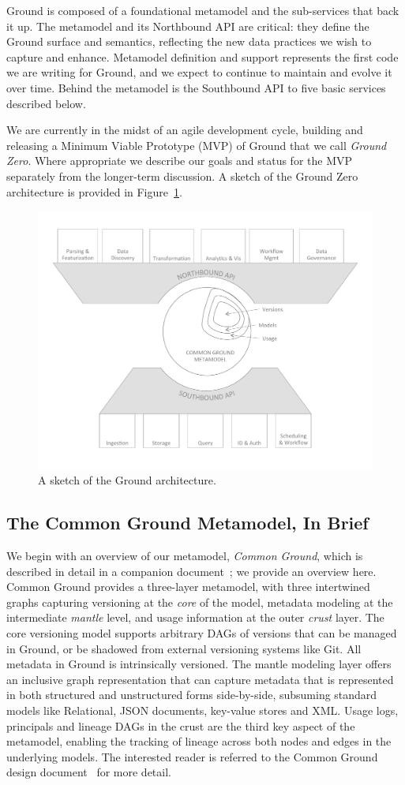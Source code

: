 Ground is composed of a foundational metamodel and the sub-services that back it up.  The metamodel and its Northbound API are critical: they define the Ground surface and semantics, reflecting the new data practices we wish to capture and enhance.  Metamodel definition and support represents the first code we are writing for Ground, and we expect to continue to maintain and evolve it over time.  Behind the metamodel is the Southbound API to five basic services described below.  

We are currently in the midst of an agile development cycle, building and releasing a Minimum Viable Prototype (MVP) of Ground that we call \emph{Ground Zero}. Where appropriate we describe our goals and status for the MVP separately from the longer-term discussion.  A sketch of the Ground Zero architecture is provided in Figure~\ref{fig:layers}.

\begin{figure}
\centering
\includegraphics[width=0.75\linewidth]{ground0fig.pdf}
\caption{A sketch of the Ground architecture.}
\label{fig:layers}
\end{figure}

\subsection{The Common Ground Metamodel, In Brief}


We begin with an overview of our metamodel, \emph{Common Ground}, which is described in detail in a companion document~\cite{commonground}; we provide an overview here.  Common Ground provides a three-layer metamodel, with three intertwined graphs capturing versioning at the \emph{core} of the model, metadata modeling at the intermediate \emph{mantle} level, and usage information at the outer \emph{crust} layer.  The core versioning model supports arbitrary DAGs of versions that can be managed in Ground, or be shadowed from external versioning systems like Git. All metadata in Ground is intrinsically versioned. The mantle modeling layer offers an inclusive graph representation that can capture metadata that is represented in both structured and unstructured forms side-by-side, subsuming standard models like Relational, JSON documents, key-value stores and XML.  Usage logs, principals and lineage DAGs in the crust are the third key aspect of the metamodel, enabling the tracking of lineage across both nodes and edges in the underlying models.  The interested reader is referred to the Common Ground design document~\cite{commonground} for more detail.

